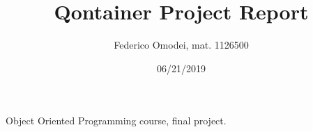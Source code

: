 
\title{\textbf{Qontainer Project Report}}
\author {Federico Omodei, mat. 1126500}
\date{06/21/2019}


\begin{titlepage}
\thispagestyle{empty}
\vfill
\maketitle

\begin{center}
\vfill
Object Oriented Programming course, final project.\\
\vfill
\end{center}
\end{titlepage}

\pagebreak

\tableofcontents

\pagebreak



\pagebreak







\pagebreak






